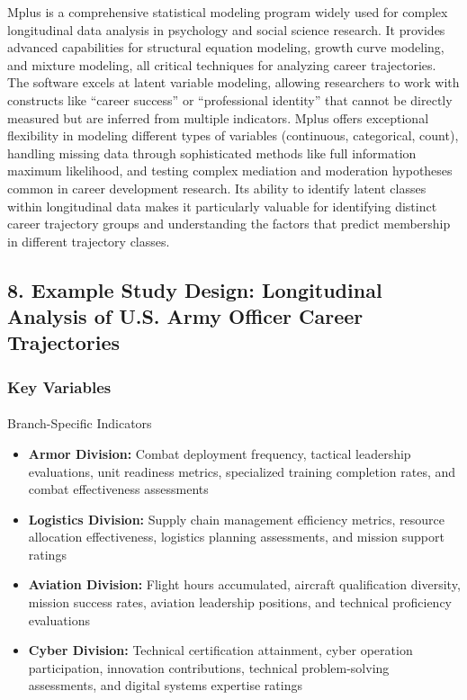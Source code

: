 \documentclass[
  letterpaper,
  DIV=11,
  numbers=noendperiod]{scrartcl}
\makeatletter
\let\oldparagraph\paragraph
\renewcommand{\paragraph}{
    \@ifstar
      \xxxParagraphStar
      \xxxParagraphNoStar
  }
\newcommand{\xxxParagraphStar}[1]{\oldparagraph*{#1}\mbox{}}
\newcommand{\xxxParagraphNoStar}[1]{\oldparagraph{#1}\mbox{}}
\providecommand{\tightlist}{%
  \setlength{\itemsep}{0pt}\setlength{\parskip}{0pt}}
\makeatother
\begin{document}
Mplus is a comprehensive statistical modeling program widely used for
complex longitudinal data analysis in psychology and social science
research. It provides advanced capabilities for structural equation
modeling, growth curve modeling, and mixture modeling, all critical
techniques for analyzing career trajectories. The software excels at
latent variable modeling, allowing researchers to work with constructs
like ``career success'' or ``professional identity'' that cannot be
directly measured but are inferred from multiple indicators. Mplus
offers exceptional flexibility in modeling different types of variables
(continuous, categorical, count), handling missing data through
sophisticated methods like full information maximum likelihood, and
testing complex mediation and moderation hypotheses common in career
development research. Its ability to identify latent classes within
longitudinal data makes it particularly valuable for identifying
distinct career trajectory groups and understanding the factors that
predict membership in different trajectory classes.

\subsection{8. Example Study Design: Longitudinal Analysis of U.S. Army
Officer Career
Trajectories}\label{example-study-design-longitudinal-analysis-of-u.s.-army-officer-career-trajectories}

\subsubsection{Key Variables}\label{key-variables}

\paragraph{Branch-Specific Indicators}\label{branch-specific-indicators}

\begin{itemize}
\tightlist
\item
  \textbf{Armor Division:} Combat deployment frequency, tactical
  leadership evaluations, unit readiness metrics, specialized training
  completion rates, and combat effectiveness assessments
\item
  \textbf{Logistics Division:} Supply chain management efficiency
  metrics, resource allocation effectiveness, logistics planning
  assessments, and mission support ratings
\item
  \textbf{Aviation Division:} Flight hours accumulated, aircraft
  qualification diversity, mission success rates, aviation leadership
  positions, and technical proficiency evaluations
\item
  \textbf{Cyber Division:} Technical certification attainment, cyber
  operation participation, innovation contributions, technical
  problem-solving assessments, and digital systems expertise ratings
\end{itemize}
\end{document}
